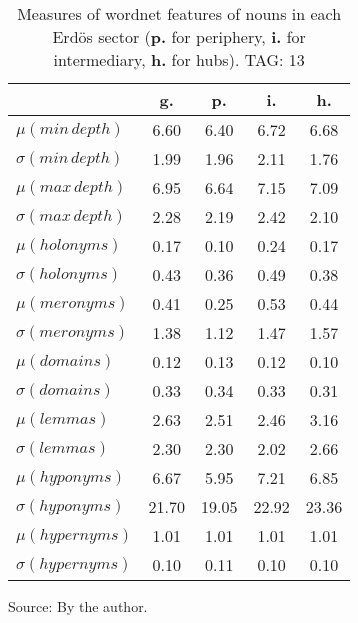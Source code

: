 \begin{table}[h!]
\begin{center}
	\caption{Measures of wordnet features of nouns in each Erd\"os sector ({{\bf p.}} for periphery, {{\bf i.}} for intermediary, {{\bf h.}} for hubs). TAG: 13}\label{tab:wnn}
\begin{tabular}{| l || c | c | c | c |}\hline
 & {\bf g.} & {\bf p.} & {\bf i.} & {\bf h.} \\\hline\hline
$\mu(min\,depth)$ & 6.60  & 6.40  & 6.72  & 6.68 \\
$\sigma(min\,depth)$ & 1.99  & 1.96  & 2.11  & 1.76 \\\hline
$\mu(max\,depth)$ & 6.95  & 6.64  & 7.15  & 7.09 \\
$\sigma(max\,depth)$ & 2.28  & 2.19  & 2.42  & 2.10 \\\hline
$\mu(holonyms)$ & 0.17  & 0.10  & 0.24  & 0.17 \\
$\sigma(holonyms)$ & 0.43  & 0.36  & 0.49  & 0.38 \\\hline
$\mu(meronyms)$ & 0.41  & 0.25  & 0.53  & 0.44 \\
$\sigma(meronyms)$ & 1.38  & 1.12  & 1.47  & 1.57 \\\hline
$\mu(domains)$ & 0.12  & 0.13  & 0.12  & 0.10 \\
$\sigma(domains)$ & 0.33  & 0.34  & 0.33  & 0.31 \\\hline
$\mu(lemmas)$ & 2.63  & 2.51  & 2.46  & 3.16 \\
$\sigma(lemmas)$ & 2.30  & 2.30  & 2.02  & 2.66 \\\hline
$\mu(hyponyms)$ & 6.67  & 5.95  & 7.21  & 6.85 \\
$\sigma(hyponyms)$ & 21.70  & 19.05  & 22.92  & 23.36 \\\hline
$\mu(hypernyms)$ & 1.01  & 1.01  & 1.01  & 1.01 \\
$\sigma(hypernyms)$ & 0.10  & 0.11  & 0.10  & 0.10 \\\hline
\end{tabular}
\begin{flushleft}\footnotesize
		Source: By the author.\
\end{flushleft}
\end{center}
\end{table}
